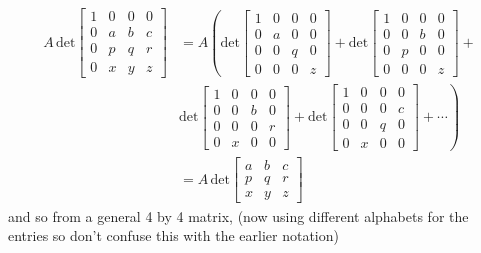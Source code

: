 \documentclass{report}
\begin{document}
\begin{align*}
A\,\text{det}\left[\begin{array}{cccc}
1&0&0&0\\
0&a&b&c\\
0&p&q&r\\
0&x&y&z
\end{array}\right]&=A\left(\text{det}\left[\begin{array}{cccc}
1&0&0&0\\
0&a&0&0\\
0&0&q&0\\
0&0&0&z
\end{array}\right]+
\text{det}\left[\begin{array}{cccc}
1&0&0&0\\
0&0&b&0\\
0&p&0&0\\
0&0&0&z
\end{array}\right]+\right.\\
&\left.\text{det}\left[\begin{array}{cccc}
1&0&0&0\\
0&0&b&0\\
0&0&0&r\\
0&x&0&0
\end{array}\right]+
\text{det}\left[\begin{array}{cccc}
1&0&0&0\\
0&0&0&c\\
0&0&q&0\\
0&x&0&0
\end{array}\right]+\cdots\right)\\
&=A\,\text{det}\left[\begin{array}{ccc}
a&b&c\\
p&q&r\\
x&y&z
\end{array}\right]
\end{align*}
and so from a general 4 by 4 matrix, (now using different alphabets for the entries so don't confuse this with the earlier notation)
\end{document}
